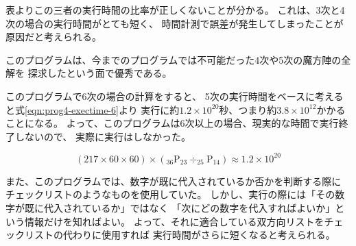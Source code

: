表よりこの三者の実行時間の比率が正しくないことが分かる。
これは、3次と4次の場合の実行時間がとても短く、
時間計測で誤差が発生してしまったことが原因だと考えられる。


このプログラムは、今までのプログラムでは不可能だった4次や5次の魔方陣の全解を
探求したという面で優秀である。

このプログラムで6次の場合の計算をすると、
5次の実行時間をベースに考えると式\ref{eqn:prog4-exectime-6}より
実行に約$1.2 \times 10^{20}$秒、つまり約$3.8 \times 10^{12}$かかることになる。
よって、このプログラムは6次以上の場合、現実的な時間で実行終了しないので、
実際に実行はしなかった。

\begin{equation} \label{eqn:prog4-exectime-6}
(217 \times 60 \times 60) \times (_{36} \mathrm{P} _{23} \div _{25} \mathrm{P} _{14}) \approx  1.2 \times 10^{20}
\end{equation}

また、このプログラムでは、数字が既に代入されているか否かを判断する際に
チェックリストのようなものを使用していた。
しかし、実行の際には「その数字が既に代入されているか」ではなく
「次にどの数字を代入すればよいか」という情報だけを知ればよい。
よって、それに適合している双方向リストをチェックリストの代わりに使用すれば
実行時間がさらに短くなると考えられる。


